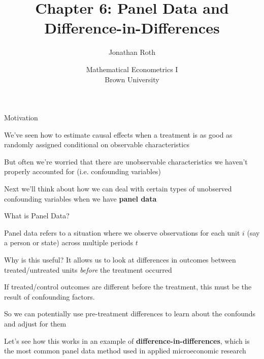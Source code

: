 \documentclass[11pt,english,handout]{beamer}
\newenvironment{wideitemize}{\itemize\addtolength{\itemsep}{10pt}}{\enditemize}
\begin{document}
	
	\begin{frame}[noframenumbering]{}
		\vspace{0.5cm}
		\title[]{Chapter 6: Panel Data and Difference-in-Differences}
		\author{Jonathan Roth}
		\date{Mathematical Econometrics I \\ Brown University\\ } 
		\titlepage {\small{}\ }\thispagestyle{empty} \vspace{-30pt}
		
	\end{frame}

	
	\begin{frame}{Motivation}
		
		\begin{wideitemize}
			\item
			We've seen how to estimate causal effects when a treatment is as good as randomly assigned conditional on observable characteristics
			
			\item
			But often we're worried that there are unobservable characteristics we haven't properly accounted for (i.e. confounding variables)
			
			\pause
			\item
			Next we'll think about how we can deal with certain types of unobserved confounding variables when we have \textbf{panel data}

			
		\end{wideitemize}

	\end{frame}

\begin{frame}{What is Panel Data?}
	\begin{wideitemize}
	\item
	Panel data refers to a situation where we observe observations for each unit $i$ (say a person or state) across multiple periods $t$				
	
	\pause
	\item
	Why is this useful? It allows us to look at differences in outcomes between treated/untreated units \textit{before} the treatment occurred
	
	\pause
	\item
	If treated/control outcomes are different before the treatment, this must be the result of confounding factors.
	
	\pause
	\item
	So we can potentially use pre-treatment differences to learn about the confounds and adjust for them
	
	\pause
	\item
	Let's see how this works in an example of \textbf{difference-in-differences}, which is the most common panel data method used in applied microeconomic research
	\end{wideitemize}

\end{frame}	
\end{document}
